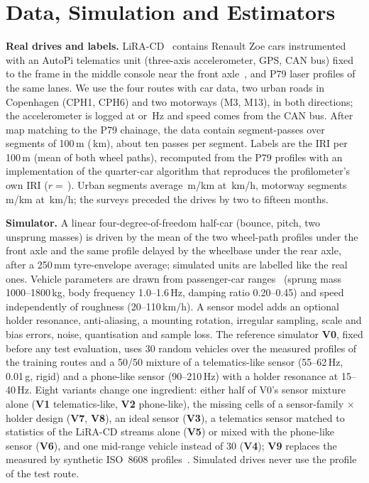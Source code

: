 \section{Data, Simulation and Estimators}
\label{sec:method}

\textbf{Real drives and labels.}
LiRA-CD~\cite{skar2023lira,lira_data} contains Renault Zoe cars instrumented with an AutoPi telematics unit (three-axis accelerometer, GPS, CAN bus) fixed to the frame in the middle console near the front axle~\cite{skar2023lira}, and P79 laser profiles of the same lanes.
We use the four routes with car data, two urban roads in Copenhagen (CPH1, CPH6) and two motorways (M3, M13), in both directions; the accelerometer is logged at \liraRateLow{} or \liraRateHigh\,Hz and speed comes from the CAN bus.
After map matching to the P79 chainage, the data contain \liraUnits{} segment-passes over \liraSegments{} segments of 100\,m (\liraKm\,km), about ten passes per segment.
Labels are the IRI per 100\,m (mean of both wheel paths), recomputed from the P79 profiles with an implementation of the quarter-car algorithm that reproduces the profilometer's own IRI ($r=$\,\iriValR).
Urban segments average \liraIriUrban\,m/km at \liraSpeedUrban\,km/h, motorway segments \liraIriMotorway\,m/km at \liraSpeedMotorway\,km/h; the surveys preceded the drives by two to fifteen months.

\textbf{Simulator.}
A linear four-degree-of-freedom half-car (bounce, pitch, two unsprung masses) is driven by the mean of the two wheel-path profiles under the front axle and the same profile delayed by the wheelbase under the rear axle, after a 250\,mm tyre-envelope average; simulated units are labelled like the real ones.
Vehicle parameters are drawn from passenger-car ranges~\cite{gillespie1992} (sprung mass 1000--1800\,kg, body frequency 1.0--1.6\,Hz, damping ratio 0.20--0.45) and speed independently of roughness (20--110\,km/h).
A sensor model adds an optional holder resonance, anti-aliasing, a mounting rotation, irregular sampling, scale and bias errors, noise, quantisation and sample loss.
The reference simulator \textbf{V0}, fixed before any test evaluation, uses 30 random vehicles over the measured profiles of the training routes and a 50/50 mixture of a telematics-like sensor (55--62\,Hz, 0.01\,g, rigid) and a phone-like sensor (90--210\,Hz) with a holder resonance at 15--40\,Hz.
Eight variants change one ingredient: either half of V0's sensor mixture alone (\textbf{V1} telematics-like, \textbf{V2} phone-like), the missing cells of a sensor-family $\times$ holder design (\textbf{V7}, \textbf{V8}), an ideal sensor (\textbf{V3}), a telematics sensor matched to statistics of the LiRA-CD streams alone (\textbf{V5}) or mixed with the phone-like sensor (\textbf{V6}), and one mid-range vehicle instead of 30 (\textbf{V4}); \textbf{V9} replaces the measured by synthetic ISO~8608 profiles~\cite{iso8608}.
Simulated drives never use the profile of the test route.

